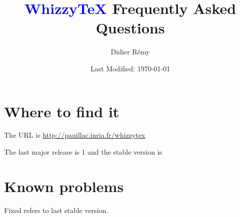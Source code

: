 \documentclass{article}
\title {\textcolor{blue}{WhizzyTeX}  Frequently Asked Questions}
\author {Didier R{\'{e}}my}
\date {Last Modified: \today}
\begin{document}
\maketitle

\tableofcontents

\section {Where to find it}

The URL is \url{http://pauillac.inria.fr/whizzytex}

The last major release is 1
and the stable version is {\version}


\section {Known problems}

Fixed refers to last stable version.
\def \FIXED {\textit{Fixed in version > 1.1}}
\end{document}
